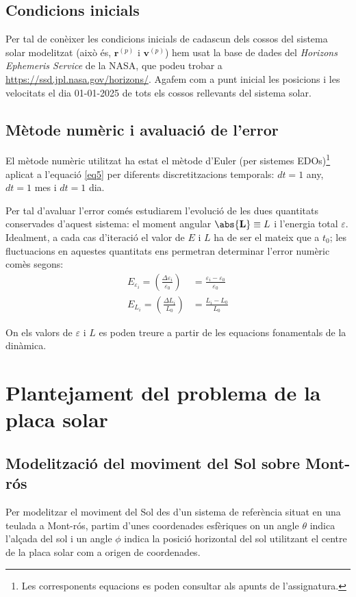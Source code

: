 \documentclass[10pt, twoside, a4paper]{article}
\begin{document}
\subsection{Condicions inicials}
Per tal de conèixer les condicions inicials de cadascun dels cossos del sistema solar modelitzat (això és, $\mathbf{r}^{(p)}$ i $\mathbf{v}^{(p)}$) hem usat la base de dades del \textit{Horizons Ephemeris Service} de la NASA, que podeu trobar a \url{https://ssd.jpl.nasa.gov/horizons/}. Agafem com a punt inicial les posicions i les velocitats el dia 01-01-2025 de tots els cossos rellevants del sistema solar.

\subsection{Mètode numèric i avaluació de l'error}
El mètode numèric utilitzat ha estat el mètode d'Euler (per sistemes EDOs)\footnote{Les corresponents equacions es poden consultar als apunts de l'assignatura.} aplicat a l'equació \eqref{eq5} per diferents discretitzacions temporals: $dt = 1$ any, $dt = 1$ mes i $dt = 1$ dia.

Per tal d'avaluar l'error comés estudiarem l'evolució de les dues quantitats conservades d'aquest sistema: el moment angular $\abs{\mathbf{L}} \equiv L$ i l'energia total $\varepsilon$. Idealment, a cada cas d'iteració el valor de $E$ i $L$ ha de ser el mateix que a $t_0$; les fluctuacions en aquestes quantitats ens permetran determinar l'error numèric comès segons:
\begin{align}
    E_{\varepsilon_i} = \left( \frac{\Delta \varepsilon_i}{\varepsilon_0} \right) & = \frac{\varepsilon_i - \varepsilon_0}{\varepsilon_0} \\
    E_{L_i} = \left( \frac{\Delta L_i}{L_0} \right) & = \frac{{L_i - L_0}}{L_0}
\end{align}

On els valors de $\varepsilon$ i $L$ es poden treure a partir de les equacions fonamentals de la dinàmica.

\section{Plantejament del problema de la placa solar}

\subsection{Modelització del moviment del Sol sobre Mont-rós}
Per modelitzar el moviment del Sol des d'un sistema de referència situat en una teulada a Mont-rós, partim d'unes coordenades esfèriques on un angle $\theta$ indica l'alçada del sol i un angle $\phi$ indica la posició horizontal del sol utilitzant el centre de la placa solar com a origen de coordenades.
\end{document}
